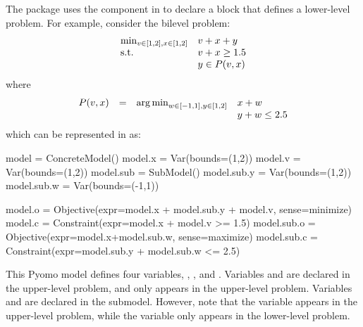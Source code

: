 The  package uses the  component in  to declare a block that defines a lower-level problem. 
For example, consider the bilevel problem:
\begin{equation}
\label{eqn:bilevel_ex1}
\begin{array}{ll}
\min_{v \in [1,2], x \in [1,2]}   & v + x + y\\
\textrm{s.t.}                 & v + x\geq 1.5\\
                    & y \in P(v,x)
\end{array}
\end{equation}
where 
\[
\begin{array}{llll}
P(v,x) & = & \operatorname*{arg\,min}_{w \in [-1,1], y \in [1,2]}    & x + w\\
 & &                            &  y + w \leq 2.5
\end{array}
\]
which can be represented in  as:

\begin{qlisting}
model = ConcreteModel()
model.x = Var(bounds=(1,2))
model.v = Var(bounds=(1,2))
model.sub = SubModel()
model.sub.y = Var(bounds=(1,2))
model.sub.w = Var(bounds=(-1,1))

model.o = Objective(expr=model.x + model.sub.y + model.v, sense=minimize)
model.c = Constraint(expr=model.x + model.v >= 1.5)
model.sub.o = Objective(expr=model.x+model.sub.w, sense=maximize)
model.sub.c = Constraint(expr=model.sub.y + model.sub.w <= 2.5)
\end{qlisting}
This Pyomo model defines four variables,  , ,  and .
Variables   and  are declared in the upper-level
problem, and  only appears in the upper-level problem.
Variables  and  are declared in the submodel.
However, note that the  variable appears in the upper-level
problem, while the  variable only appears in the
lower-level problem.

